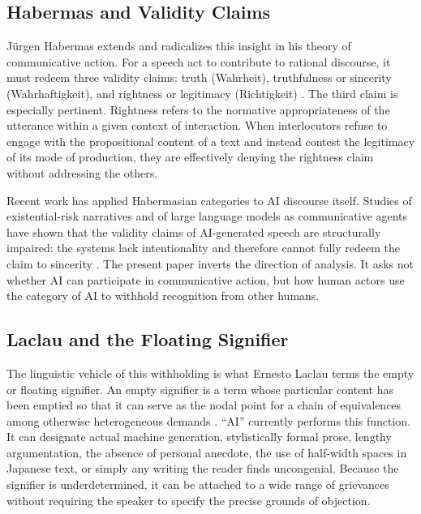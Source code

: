 \documentclass[12pt,a4paper]{article}
\begin{document}
\subsection{Habermas and Validity Claims}

Jürgen Habermas extends and radicalizes this insight in his theory of communicative action. For a speech act to contribute to rational discourse, it must redeem three validity claims: truth (Wahrheit), truthfulness or sincerity (Wahrhaftigkeit), and rightness or legitimacy (Richtigkeit) \citep{habermas1984,habermas1987}. The third claim is especially pertinent. Rightness refers to the normative appropriateness of the utterance within a given context of interaction. When interlocutors refuse to engage with the propositional content of a text and instead contest the legitimacy of its mode of production, they are effectively denying the rightness claim without addressing the others.

Recent work has applied Habermasian categories to AI discourse itself. Studies of existential-risk narratives and of large language models as communicative agents have shown that the validity claims of AI-generated speech are structurally impaired: the systems lack intentionality and therefore cannot fully redeem the claim to sincerity \citep{talking2024,communicative2026}. The present paper inverts the direction of analysis. It asks not whether AI can participate in communicative action, but how human actors use the category of AI to withhold recognition from other humans.

\subsection{Laclau and the Floating Signifier}

The linguistic vehicle of this withholding is what Ernesto Laclau terms the empty or floating signifier. An empty signifier is a term whose particular content has been emptied so that it can serve as the nodal point for a chain of equivalences among otherwise heterogeneous demands \citep{laclau1996,laclau2005}. ``AI'' currently performs this function. It can designate actual machine generation, stylistically formal prose, lengthy argumentation, the absence of personal anecdote, the use of half-width spaces in Japanese text, or simply any writing the reader finds uncongenial. Because the signifier is underdetermined, it can be attached to a wide range of grievances without requiring the speaker to specify the precise grounds of objection.
\end{document}
